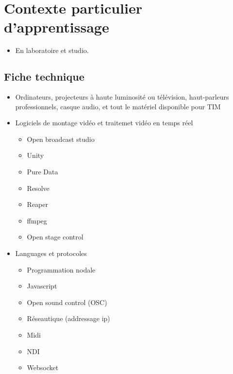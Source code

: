 \documentclass[
]{book}
\providecommand{\tightlist}{%
  \setlength{\itemsep}{0pt}\setlength{\parskip}{0pt}}
\begin{document}
\hypertarget{contexte-particulier-dapprentissage}{%
\section{Contexte particulier d'apprentissage}\label{contexte-particulier-dapprentissage}}

\begin{itemize}
\tightlist
\item
  En laboratoire et studio.
\end{itemize}

\hypertarget{fiche-technique}{%
\subsection{Fiche technique}\label{fiche-technique}}

\begin{itemize}
\tightlist
\item
  Ordinateurs, projecteurs à haute luminosité ou télévision, haut-parleurs professionnels, casque audio, et tout le matériel disponible pour TIM
\item
  Logiciels de montage vidéo et traitemet vidéo en temps réel

  \begin{itemize}
  \tightlist
  \item
    Open broadcast studio
  \item
    Unity
  \item
    Pure Data
  \item
    Resolve
  \item
    Reaper
  \item
    ffmpeg
  \item
    Open stage control
  \end{itemize}
\item
  Languages et protocoles

  \begin{itemize}
  \tightlist
  \item
    Programmation nodale
  \item
    Javascript
  \item
    Open sound control (OSC)
  \item
    Réseautique (addressage ip)
  \item
    Midi
  \item
    NDI
  \item
    Websocket
  \end{itemize}
\end{itemize}
\end{document}
